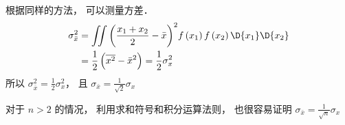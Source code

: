 根据同样的方法， 可以测量方差．
  \begin{equation}
  \begin{aligned}
\sigma _{\bar x}^2 &= \iint {{{\left( {\frac{{{x_1} + {x_2}}}{2} - \bar x} \right)}^2}f\left( {{x_1}} \right)f\left( {{x_2}} \right)\D {x_1}\D {x_2}} \\
&= \frac{1}{2}\left( {\overline {{x^2}}  - {{\bar x}^2}} \right) = \frac{1}{2}\sigma _x^2
\end{aligned} 
\end{equation}
所以 $\sigma _{\bar x}^2 = \frac{1}{2}\sigma _x^2$，  且  ${\sigma _{\bar x}} = \frac{1}{{\sqrt 2 }}{\sigma _x}$ 

对于 $n > 2$ 的情况， 利用求和符号和积分运算法则， 也很容易证明  ${\sigma _{\bar x}} = \frac{1}{{\sqrt n }}{\sigma _x}$ 
